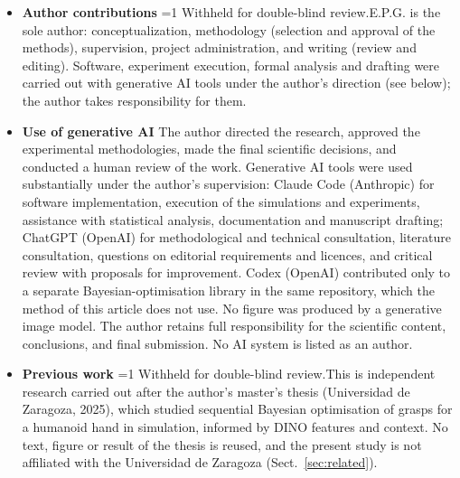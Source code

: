 \documentclass[pdflatex,sn-mathphys-num,iicol]{sn-jnl}
\providecommand{\anonymous}{0}
\newcommand{\anon}[2]{\ifnum\anonymous=1 #1\else #2\fi}
\begin{document}
\begin{itemize}
\item \textbf{Author contributions} \anon{Withheld for double-blind review.}{E.P.G. is the sole author: conceptualization, methodology (selection and approval of the methods), supervision, project administration, and writing (review and editing). Software, experiment execution, formal analysis and drafting were carried out with generative AI tools under the author's direction (see below); the author takes responsibility for them.}
\item \textbf{Use of generative AI} The author directed the research, approved the experimental methodologies, made the final scientific decisions, and conducted a human review of the work. Generative AI tools were used substantially under the author's supervision: Claude Code (Anthropic) for software implementation, execution of the simulations and experiments, assistance with statistical analysis, documentation and manuscript drafting; ChatGPT (OpenAI) for methodological and technical consultation, literature consultation, questions on editorial requirements and licences, and critical review with proposals for improvement. Codex (OpenAI) contributed only to a separate Bayesian-optimisation library in the same repository, which the method of this article does not use. No figure was produced by a generative image model. The author retains full responsibility for the scientific content, conclusions, and final submission. No AI system is listed as an author.
\item \textbf{Previous work} \anon{Withheld for double-blind review.}{This is independent research carried out after the author's master's thesis \cite{perezgonzalez2025tfm} (Universidad de Zaragoza, 2025), which studied sequential Bayesian optimisation of grasps for a humanoid hand in simulation, informed by DINO features and context. No text, figure or result of the thesis is reused, and the present study is not affiliated with the Universidad de Zaragoza (Sect.~\ref{sec:related}).}
\end{itemize}


\end{document}
